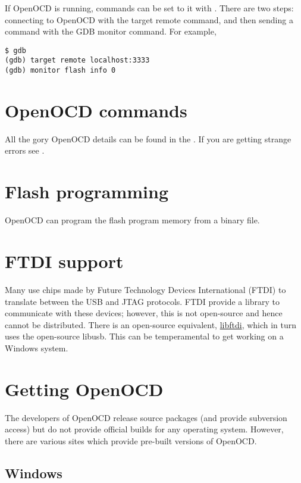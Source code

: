 If OpenOCD is running, commands can be set to it with
. There are two steps: connecting to OpenOCD with
the target remote command, and then sending a command with the GDB
monitor command. For example,

\begin{verbatim}
$ gdb
(gdb) target remote localhost:3333
(gdb) monitor flash info 0
\end{verbatim}

\section{OpenOCD commands}
\label{openocd-commands}

All the gory OpenOCD details can be found in the
. If you are getting strange
errors see .

\section{Flash programming}
\label{flash-programming}

OpenOCD can program the flash program memory from a binary file.

\section{FTDI support}
\label{ftdi-support}

Many  use chips made by Future
Technology Devices International (FTDI) to translate between the USB and
JTAG protocols. FTDI provide a library to communicate with these
devices; however, this is not open-source and hence cannot be
distributed. There is an open-source equivalent,
\href{http://freshmeat.net/projects/libftdi/}{libftdi}, which in turn
uses the open-source libusb. This can be temperamental to get working on
a Windows system.

\section{Getting OpenOCD}
\label{getting-openocd}

The developers of OpenOCD release source packages (and provide
subversion access) but do not provide official builds for any
operating system. However, there are various sites which provide
pre-built versions of OpenOCD.

\subsection{Windows}
\label{windows}

